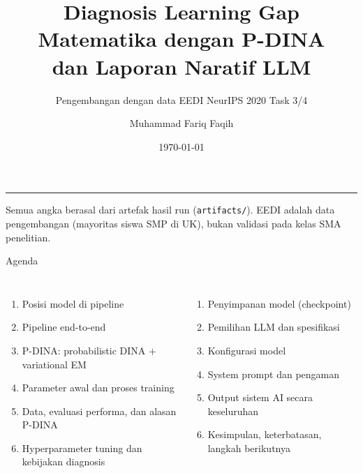 \documentclass[aspectratio=169,10pt]{beamer}
\title{Diagnosis Learning Gap Matematika dengan P-DINA\\ dan Laporan Naratif LLM}
\subtitle{Pengembangan dengan data EEDI NeurIPS 2020 Task 3/4}
\author{Muhammad Fariq Faqih}
\date{\today}
\begin{document}
\begin{frame}[plain]
  \vfill
  {\Large\bfseries\inserttitle\par}
  \vspace{0.6em}
  {\color{black!70}\insertsubtitle\par}
  \vspace{1.2em}
  {\color{accent}\rule{0.35\linewidth}{1.2pt}}\par
  \vspace{0.8em}
  {\small\insertauthor\par}
  {\small\color{midgray}\insertdate\par}
  \vfill
  {\tiny\color{midgray}Semua angka berasal dari artefak hasil run (\texttt{artifacts/}). EEDI adalah data pengembangan
  (mayoritas siswa SMP di UK), bukan validasi pada kelas SMA penelitian.}
\end{frame}

\begin{frame}{Agenda}
  \begin{columns}[T]
    \begin{enumerate}\small
      \item Posisi model di pipeline
      \item Pipeline end-to-end
      \item P-DINA: probabilistic DINA + variational EM
      \item Parameter awal dan proses training
      \item Data, evaluasi performa, dan alasan P-DINA
      \item Hyperparameter tuning dan kebijakan diagnosis
    \end{enumerate}
    \begin{enumerate}\small\setcounter{enumi}{6}
      \item Penyimpanan model (checkpoint)
      \item Pemilihan LLM dan spesifikasi
      \item Konfigurasi model
      \item System prompt dan pengaman
      \item Output sistem AI secara keseluruhan
      \item Kesimpulan, keterbatasan, langkah berikutnya
    \end{enumerate}
  \end{columns}
\end{frame}
\end{document}
